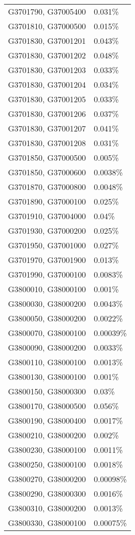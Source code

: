 \begin{longtable}[]{@{}ll@{}}
G3701790, G37005400 & 0.031\% \\
G3701810, G37000500 & 0.015\% \\
G3701830, G37001201 & 0.043\% \\
G3701830, G37001202 & 0.048\% \\
G3701830, G37001203 & 0.033\% \\
G3701830, G37001204 & 0.034\% \\
G3701830, G37001205 & 0.033\% \\
G3701830, G37001206 & 0.037\% \\
G3701830, G37001207 & 0.041\% \\
G3701830, G37001208 & 0.031\% \\
G3701850, G37000500 & 0.005\% \\
G3701850, G37000600 & 0.0038\% \\
G3701870, G37000800 & 0.0048\% \\
G3701890, G37000100 & 0.025\% \\
G3701910, G37004000 & 0.04\% \\
G3701930, G37000200 & 0.025\% \\
G3701950, G37001000 & 0.027\% \\
G3701970, G37001900 & 0.013\% \\
G3701990, G37000100 & 0.0083\% \\
G3800010, G38000100 & 0.001\% \\
G3800030, G38000200 & 0.0043\% \\
G3800050, G38000200 & 0.0022\% \\
G3800070, G38000100 & 0.00039\% \\
G3800090, G38000200 & 0.0033\% \\
G3800110, G38000100 & 0.0013\% \\
G3800130, G38000100 & 0.001\% \\
G3800150, G38000300 & 0.03\% \\
G3800170, G38000500 & 0.056\% \\
G3800190, G38000400 & 0.0017\% \\
G3800210, G38000200 & 0.002\% \\
G3800230, G38000100 & 0.0011\% \\
G3800250, G38000100 & 0.0018\% \\
G3800270, G38000200 & 0.00098\% \\
G3800290, G38000300 & 0.0016\% \\
G3800310, G38000200 & 0.0013\% \\
G3800330, G38000100 & 0.00075\% \\

\end{longtable}
